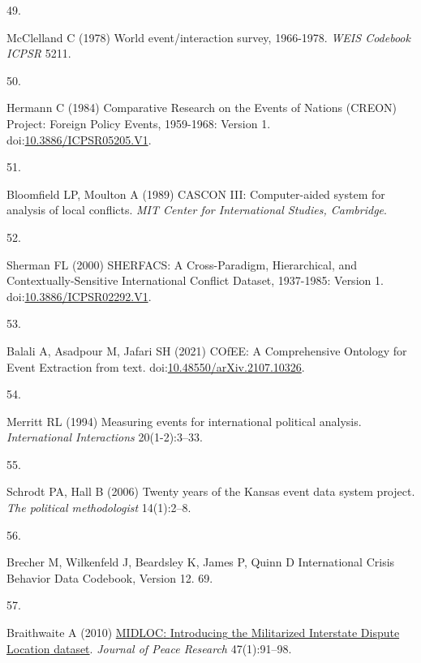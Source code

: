 \documentclass{article}
\newlength{\cslhangindent}
\newlength{\csllabelwidth}
\newlength{\cslentryspacingunit} %
\newenvironment{CSLReferences}[2] %
 {%
  \setlength{\parindent}{0pt}
  \ifodd #1
  \let\oldpar\par
  \def\par{\hangindent=\cslhangindent\oldpar}
  \fi
  \setlength{\parskip}{#2\cslentryspacingunit}
 }%
 {}
\newcommand{\CSLLeftMargin}[1]{\parbox[t]{\csllabelwidth}{#1}}
\newcommand{\CSLRightInline}[1]{\parbox[t]{\linewidth - \csllabelwidth}{#1}\break}
\begin{document}
\begin{CSLReferences}{0}{0}
\leavevmode{}%
\CSLLeftMargin{49. }%
\CSLRightInline{McClelland C (1978) World event/interaction survey,
1966-1978. \emph{WEIS Codebook ICPSR} 5211.}

\leavevmode{}%
\CSLLeftMargin{50. }%
\CSLRightInline{Hermann C (1984) Comparative {Research} on the {Events}
of {Nations} ({CREON}) {Project}: {Foreign Policy Events}, 1959-1968:
{Version} 1.
doi:\href{https://doi.org/10.3886/ICPSR05205.V1}{10.3886/ICPSR05205.V1}.}

\leavevmode{}%
\CSLLeftMargin{51. }%
\CSLRightInline{Bloomfield LP, Moulton A (1989) {CASCON III}:
{Computer-aided} system for analysis of local conflicts. \emph{MIT
Center for International Studies, Cambridge}.}

\leavevmode{}%
\CSLLeftMargin{52. }%
\CSLRightInline{Sherman FL (2000) {SHERFACS}: {A Cross-Paradigm},
{Hierarchical}, and {Contextually-Sensitive International Conflict
Dataset}, 1937-1985: {Version} 1.
doi:\href{https://doi.org/10.3886/ICPSR02292.V1}{10.3886/ICPSR02292.V1}.}

\leavevmode{}%
\CSLLeftMargin{53. }%
\CSLRightInline{Balali A, Asadpour M, Jafari SH (2021) {COfEE}: {A
Comprehensive Ontology} for {Event Extraction} from text.
doi:\href{https://doi.org/10.48550/arXiv.2107.10326}{10.48550/arXiv.2107.10326}.}

\leavevmode{}%
\CSLLeftMargin{54. }%
\CSLRightInline{Merritt RL (1994) Measuring events for international
political analysis. \emph{International Interactions} 20(1-2):3--33.}

\leavevmode{}%
\CSLLeftMargin{55. }%
\CSLRightInline{Schrodt PA, Hall B (2006) Twenty years of the {Kansas}
event data system project. \emph{The political methodologist}
14(1):2--8.}

\leavevmode{}%
\CSLLeftMargin{56. }%
\CSLRightInline{Brecher M, Wilkenfeld J, Beardsley K, James P, Quinn D
International {Crisis Behavior Data Codebook}, {Version} 12. 69.}

\leavevmode{}%
\CSLLeftMargin{57. }%
\CSLRightInline{Braithwaite A (2010)
\href{https://doi.org/10.1177/0022343309350008}{{MIDLOC}: {Introducing}
the {Militarized Interstate Dispute Location} dataset}. \emph{Journal of
Peace Research} 47(1):91--98.}


\end{CSLReferences}
\end{document}
